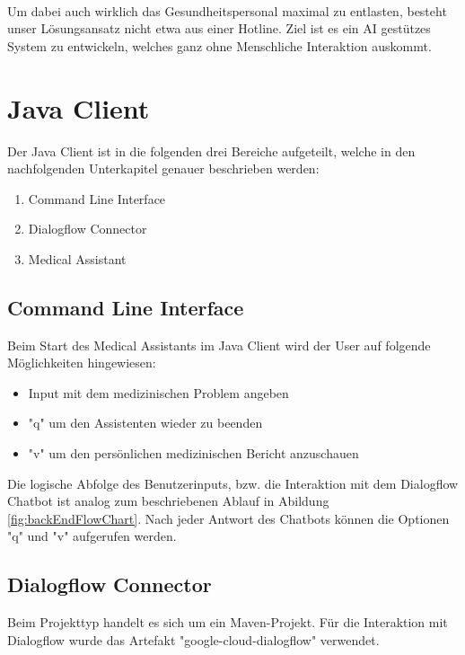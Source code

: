 \documentclass[11pt,a4paper]{article}
\begin{document}
        \paragraph{}
            Um dabei auch wirklich das Gesundheitspersonal maximal zu entlasten, besteht unser
            Lösungsansatz nicht etwa aus einer Hotline. Ziel ist es ein AI gestützes System zu entwickeln,
            welches ganz ohne Menschliche Interaktion auskommt.


\newpage

\section{Java Client}
	Der Java Client ist in die folgenden drei Bereiche aufgeteilt, welche in den nachfolgenden Unterkapitel genauer beschrieben werden:
	\begin{enumerate}
		\item Command Line Interface
		\item Dialogflow Connector
		\item Medical Assistant
	\end{enumerate}
	
	\subsection{Command Line Interface}
		Beim Start des Medical Assistants im Java Client wird der User auf folgende Möglichkeiten hingewiesen:
		\begin{itemize}
			\item Input mit dem medizinischen Problem angeben
			\item "q" um den Assistenten wieder zu beenden
			\item "v" um den persönlichen medizinischen Bericht anzuschauen
		\end{itemize}
		Die logische Abfolge des Benutzerinputs, bzw. die Interaktion mit dem Dialogflow Chatbot ist analog zum beschriebenen Ablauf in Abildung \ref{fig:backEndFlowChart}. Nach jeder Antwort des Chatbots können die Optionen "q" und "v" aufgerufen werden.
	
	\subsection{Dialogflow Connector}
		Beim Projekttyp handelt es sich um ein Maven-Projekt. Für die Interaktion mit Dialogflow wurde das Artefakt "google-cloud-dialogflow" verwendet.
		
\end{document}
